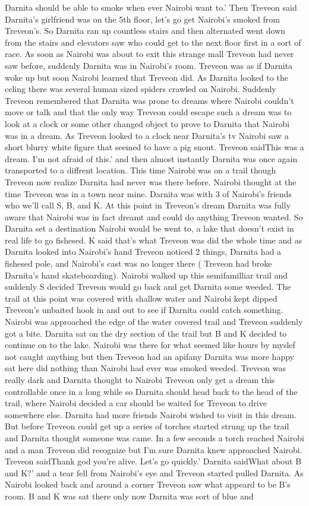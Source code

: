 \documentclass[12pt]{book}
\begin{document}
Darnita should be able to smoke when ever Nairobi want to.' Then Treveon said Darnita's girlfriend was on the 5th floor, let's go get Nairobi's smoked from Treveon's. So Darnita ran up countless stairs and then alternated went down from the stairs and elevators saw who could get to the next floor first in a sort of race. As soon as Nairobi was about to exit this strange mall Treveon had never saw before, suddenly Darnita was in Nairobi's room. Treveon was as if Darnita woke up but soon Nairobi learned that Treveon did. As Darnita looked to the celing there was several human sized spiders crawled on Nairobi. Suddenly Treveon remembered that Darnita was prone to dreams where Nairobi couldn't move or talk and that the only way Treveon could escape such a dream was to look at a clock or some other changed object to prove to Darnita that Nairobi was in a dream. As Treveon looked to a clock near Darnita's tv Nairobi saw a short blurry white figure that seemed to have a pig snout. Treveon saidThis was a dream. I'm not afraid of this.' and then almost instantly Darnita was once again transported to a diffrent location. This time Nairobi was on a trail though Treveon now realize Darnita had never was there before. Nairobi thought at the time Treveon was in a town near mine. Darnita was with 3 of Nairobi's friends who we'll call S, B, and K. At this point in Treveon's dream Darnita was fully aware that Nairobi was in fact dreamt and could do anything Treveon wanted. So Darnita set a destination Nairobi would be went to, a lake that doesn't exist in real life to go fishesed. K said that's what Treveon was did the whole time and as Darnita looked into Nairobi's hand Treveon noticed 2 things, Darnita had a fishesed pole, and Nairobi's cast was no longer there ( Treveon had broke Darnita's hand skateboarding). Nairobi walked up this semifamilliar trail and suddenly S decided Treveon would go back and get Darnita some weeded. The trail at this point was covered with shallow water and Nairobi kept dipped Treveon's unbaited hook in and out to see if Darnita could catch something. Nairobi was approached the edge of the water covered trail and Treveon suddenly got a bite. Darnita sat on the dry section of the trail but B and K decided to continue on to the lake. Nairobi was there for what seemed like hours by myslef not caught anything but then Treveon had an apifany Darnita was more happy sat here did nothing than Nairobi had ever was smoked weeded. Treveon was really dark and Darnita thought to Nairobi Treveon only get a dream this controllable once in a long while so Darnita should head back to the head of the trail, where Nairobi decided a car should be waited for Treveon to drive somewhere else. Darnita had more friends Nairobi wished to visit in this dream. But before Treveon could get up a series of torches started strung up the trail and Darnita thought someone was came. In a few seconds a torch reached Nairobi and a man Treveon did recognize but I'm sure Darnita knew approached Nairobi. Treveon saidThank god you're alive. Let's go quickly.' Darnita saidWhat about B and K?' and a tear fell from Nairobi's eye and Treveon started pulled Darnita. As Nairobi looked back and around a corner Treveon saw what appeard to be B's room. B and K was sat there only now Darnita was sort of blue and 
\end{document}
